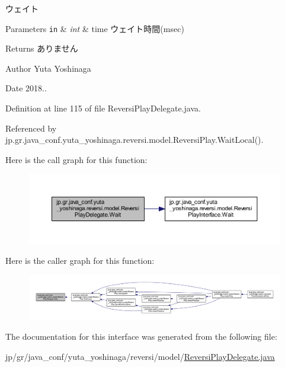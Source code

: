 ウェイト 


\begin{DoxyParams}[1]{Parameters}
\mbox{\tt in}  & {\em int} & time ウェイト時間(msec) \\
\hline
\end{DoxyParams}
\begin{DoxyReturn}{Returns}
ありません 
\end{DoxyReturn}
\begin{DoxyAuthor}{Author}
Yuta Yoshinaga 
\end{DoxyAuthor}
\begin{DoxyDate}{Date}
2018.. 
\end{DoxyDate}


Definition at line 115 of file Reversi\+Play\+Delegate.\+java.



Referenced by jp.\+gr.\+java\+\_\+conf.\+yuta\+\_\+yoshinaga.\+reversi.\+model.\+Reversi\+Play.\+Wait\+Local().

Here is the call graph for this function\+:
\nopagebreak
\begin{figure}[H]
\begin{center}
\leavevmode
\includegraphics[width=350pt]{classjp_1_1gr_1_1java__conf_1_1yuta__yoshinaga_1_1reversi_1_1model_1_1_reversi_play_delegate_a1adfbc7bcedb4f06a5d3b1b30f13116b_cgraph}
\end{center}
\end{figure}
Here is the caller graph for this function\+:
\nopagebreak
\begin{figure}[H]
\begin{center}
\leavevmode
\includegraphics[width=350pt]{classjp_1_1gr_1_1java__conf_1_1yuta__yoshinaga_1_1reversi_1_1model_1_1_reversi_play_delegate_a1adfbc7bcedb4f06a5d3b1b30f13116b_icgraph}
\end{center}
\end{figure}


The documentation for this interface was generated from the following file\+:\begin{DoxyCompactItemize}
\item 
jp/gr/java\+\_\+conf/yuta\+\_\+yoshinaga/reversi/model/\hyperlink{_reversi_play_delegate_8java}{Reversi\+Play\+Delegate.\+java}\end{DoxyCompactItemize}
